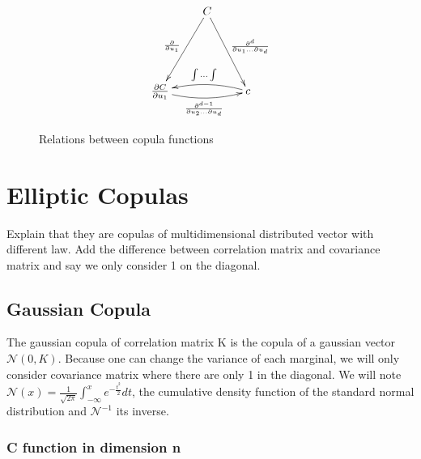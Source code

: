 \documentclass{article}
\begin{document}
	\begin{figure}
	\[
   	\xymatrix{
   		 & C \ar[ldd]_{\frac{\partial}{\partial u_{1}}} \ar[rdd]^{\frac{\partial^d}{\partial u_{1} ... \partial u_{d}}} & \\
   		 & & \\
   		\frac{\partial C}{\partial u_{1}} \ar@/_/[rr]_{\frac{\partial^{d-1}}{\partial u_{2} ... \partial u_{d}}} & & c \ar@/_/[ll]_{\int ... \int}
   	}
   \]
	\caption{Relations between copula functions}
	\end{figure}


   \section{Elliptic Copulas}
   Explain that they are copulas of multidimensional distributed vector with different law.
   Add the difference between correlation matrix and covariance matrix and say we only consider 1 on the diagonal.

	\subsection{Gaussian Copula}

	The gaussian copula of correlation matrix K is the copula of a gaussian vector \begin{math} \mathcal{N}(0,K) \end{math}.\newline
	\newline
	Because one can change the variance of each marginal, we will only consider covariance matrix where there are only 1 in the diagonal.
	\newline
	\newline
	We will note \begin{math} \mathcal{N}(x)=\frac{1}{\sqrt{2\pi}}\int_{-\infty}^{x} e^{-\frac{t^{2}}{2}}dt \end{math}, the cumulative density function of the standard normal distribution and \begin{math} \mathcal{N}^{-1} \end{math} its inverse.

	\subsubsection{C function in dimension n}
\end{document}
